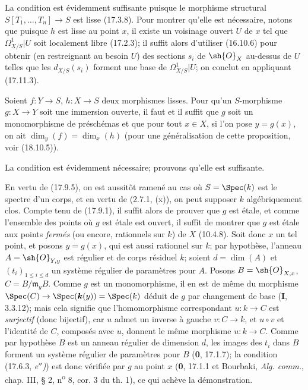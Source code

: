 
La condition est évidemment suffisante puisque le morphisme structural $S[T_1,\ldots,T_n]\to S$ est lisse (17.3.8). Pour montrer qu'elle est nécessaire, notons que puisque $h$ est lisse au point $x$, il existe un voisinage ouvert $U$ de $x$ tel que $\varOmega^1_{X/S}|U$ soit localement libre (17.2.3); il suffit alors d'utiliser (16.10.6) pour obtenir (en restreignant au besoin $U$) des sections $s_i$ de $\sh{O}_X$ au-dessus de $U$ telles que les $d_{X/S}(s_i)$ forment une base de $\varOmega^1_{X/S}|U$; on conclut en appliquant (17.11.3).

\begin{proposition}[17.11.5]
\label{IV.17.11.5}
Soient $f:Y\to S$, $h:X\to S$ deux morphismes lisses. Pour qu'un $S$-morphisme $g:X\to Y$ soit une immersion ouverte, il faut et il suffit que $g$ soit un monomorphisme de préschémas et que pour tout $x\in X$, si l'on pose $y=g(x)$, on ait $\dim_y(f)=\dim_x(h)$ \textup{(pour une généralisation de cette proposition, voir (18.10.5))}.
\end{proposition}

La condition est évidemment nécessaire; prouvons qu'elle est suffisante.

En vertu de (17.9.5), on est aussitôt ramené au cas où $S=\Spec(k)$ est le spectre d'un corps, et en vertu de (2.7.1, (x)), on peut supposer $k$ algébriquement clos. Compte tenu de (17.9.1), il suffit alors de prouver que $g$ est étale, et comme l'ensemble des points où $g$ est étale est ouvert, il suffit de montrer que $g$ est étale aux points \emph{fermés} (ou encore, rationnels sur $k$) de $X$ (10.4.8). Soit donc $x$ un tel point, et posons $y=g(x)$, qui est aussi rationnel sur $k$; par hypothèse, l'anneau $A=\sh{O}_{Y,y}$ est régulier et de corps résiduel $k$; soient $d=\dim(A)$ et $(t_i)_{1\leq i\leq d}$ un système régulier de paramètres pour $A$. Posons $B=\sh{O}_{X,x}$, $C=B/\mathfrak m_yB$. Comme $g$ est un monomorphisme, il en est de même du morphisme $\Spec(C)\to\Spec(\boldsymbol{k}(y))=\Spec(k)$ déduit de $g$ par changement de base (\textbf{I}, 3.3.12); mais cela signifie que l'homomorphisme correspondant $u:k\to C$ est \emph{surjectif} (donc bijectif), car $u$ admet un inverse à gauche $v:C\to k$, et $u\circ v$ et l'identité de $C$, composés avec $u$, donnent le même morphisme $u:k\to C$. Comme par hypothèse $B$ est un anneau régulier de dimension $d$, les images des $t_i$ dans $B$ forment un système régulier de paramètres pour $B$ (\textbf{0}, 17.1.7); la condition (17.6.3, \emph{e$''$)}) est donc vérifiée par $g$ au point $x$ (\textbf{0}, 17.1.1 et Bourbaki, \emph{Alg. comm.}, chap. III, § 2, n\textsuperscript{o} 8, cor. 3 du th. 1), ce qui achève la démonstration.

